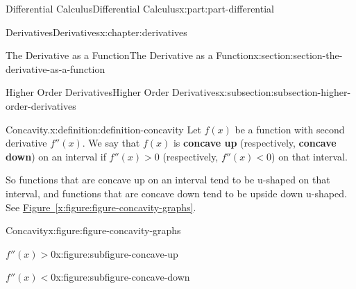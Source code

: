 \documentclass[twoside,10pt,]{tufte-book}
\newcommand{\xreffont}{\relax}
\newcommand{\terminology}[1]{\textbf{#1}}
\numberwithin{equation}{part}
\begin{document}
\begin{partptx}{Differential Calculus}{}{Differential Calculus}{}{}{x:part:part-differential}
\begin{chapterptx}{Derivatives}{}{Derivatives}{}{}{x:chapter:derivatives}
\begin{sectionptx}{The Derivative as a Function}{}{The Derivative as a Function}{}{}{x:section:section-the-derivative-as-a-function}
\begin{subsectionptx}{Higher Order Derivatives}{}{Higher Order Derivatives}{}{}{x:subsection:subsection-higher-order-derivatives}
\begin{definition}{Concavity.}{x:definition:definition-concavity}%
Let \(f(x)\) be a function with second derivative \(f''(x)\). We say that \(f(x)\) is \terminology{concave up} (respectively, \terminology{concave down}) on an interval if \(f''(x)>0\) (respectively, \(f''(x) <0\)) on that interval.%
\end{definition}
So functions that are concave up on an interval tend to be u-shaped on that interval, and functions that are concave down tend to be upside down u-shaped. See \hyperref[x:figure:figure-concavity-graphs]{Figure~{\xreffont\ref{x:figure:figure-concavity-graphs}}}.%
\begin{figureptx}{Concavity}{x:figure:figure-concavity-graphs}{}%
\begin{sidebyside}{2}{0}{0}{0}%
\begin{sbspanel}{0.5}%
\begin{subfigureptx}{\(f''(x) > 0\)}{x:figure:subfigure-concave-up}{}%
%
\tcblower
\end{subfigureptx}%
\end{sbspanel}%
\begin{sbspanel}{0.5}%
\begin{subfigureptx}{\(f''(x) < 0\)}{x:figure:subfigure-concave-down}{}%
%
\tcblower
\end{subfigureptx}%

\end{sbspanel}
\end{sidebyside}
\end{figureptx}
\end{subsectionptx}
\end{sectionptx}
\end{chapterptx}
\end{partptx}
\end{document}
